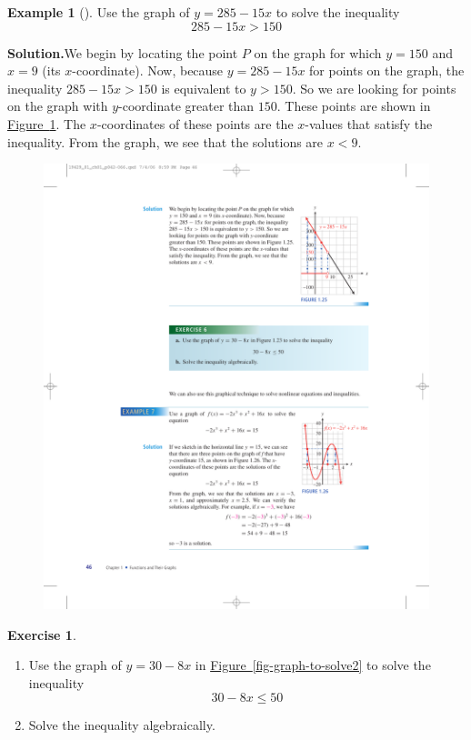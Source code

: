 \documentclass[10pt,]{book}
\theoremstyle{plain}
\theoremstyle{definition}
\theoremstyle{definition}
\newtheorem{example}[theorem]{Example}
\theoremstyle{definition}
\theoremstyle{definition}
\newtheorem{exercise}[theorem]{Exercise}
\numberwithin{equation}{part}
\newcommand{\lt}{<}
\newcommand{\gt}{>}
\begin{document}
\begin{example}[]\label{example-graph-to-solve2}
Use the graph of \(y = 285 - 15x\) to solve the inequality%
\begin{equation*}
285 - 15x \gt 150
\end{equation*}
%
\par\medskip\noindent%
\textbf{Solution.}\quad We begin by locating the point \(P\) on the graph for which \(y = 150\) and \(x = 9\) (its \(x\)-coordinate). Now, because \(y = 285 - 15x\) for points on the graph, the inequality \(285 - 15x \gt 150\) is equivalent to \(y \gt 150\). So we are looking for points on the graph with \(y\)-coordinate greater than \(150\). These points are shown in \hyperref[fig-graph-to-solve-inequality]{Figure~\ref{fig-graph-to-solve-inequality}}. The \(x\)-coordinates of these points are the \(x\)-values that satisfy the inequality. From the graph, we see that the solutions are \(x \lt 9\). \begin{figure}
\centering
\includegraphics[width=0.5\linewidth]{images/fig-graph-to-solve-inequality}
\caption{\label{fig-graph-to-solve-inequality}}
\end{figure}
%
\end{example}
\begin{exercise}\label{exercise-graph-to-solve-inequality}
\leavevmode%
\begin{enumerate}[label=*\alph**]
\item\hypertarget{li-630}{}Use the graph of \(y = 30 - 8x\) in  \hyperref[fig-graph-to-solve2]{Figure~\ref{fig-graph-to-solve2}} to solve the inequality%
\begin{equation*}
30 - 8x \le 50
\end{equation*}
%
\item\hypertarget{li-631}{}Solve the inequality algebraically.%
\end{enumerate}
\end{exercise}
\end{document}
